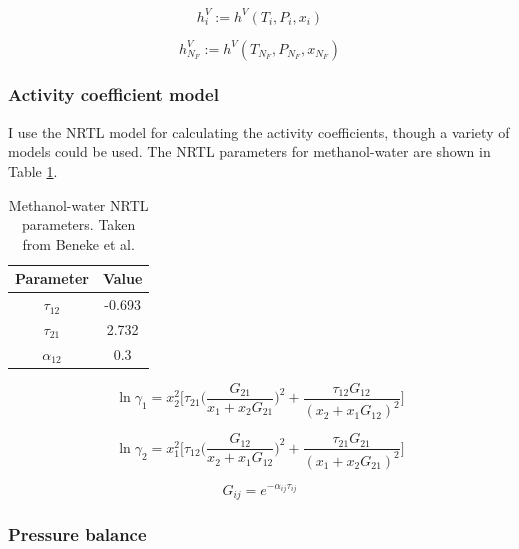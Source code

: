 \begin{equation}
    h^V_i := h^V(T_i, P_i,x_i)
\end{equation}

\begin{equation}
    h^V_{N_F} := h^V(T_{N_F}, P_{N_F},x_{N_F})
\end{equation}


\subsubsection{Activity coefficient model}

I use the NRTL model for calculating the activity coefficients, though a variety of models could be used. The NRTL parameters for methanol-water are shown in Table \ref{tab:nrtl_parameters}.

\begin{table}[]
    \centering
    \caption{Methanol-water NRTL parameters. Taken from Beneke et al.\cite{Beneke2012}}
    \begin{tabular}{cc}
        Parameter & Value \\
        \hline
         $\tau_{12}$ & -0.693  \\
         $\tau_{21}$ & 2.732   \\
         $\alpha_{12}$ & 0.3 \\
    \end{tabular}
    \label{tab:nrtl_parameters}
\end{table}

\begin{equation}
    \ln \gamma_{1} = x_2^2\biggl [\tau_{21} \biggl (\frac{G_{21}}{x_1+x_2G_{21}}\biggr)^2 + \frac{\tau_{12}G_{12}}{(x_2 + x_1 G_{12})^2} \biggr ]
\end{equation}

\begin{equation}
     \ln \gamma_{2} = x_1^2\biggl [\tau_{12} \biggl (\frac{G_{12}}{x_2+x_1G_{12}}\biggr)^2 + \frac{\tau_{21}G_{21}}{(x_1 + x_2 G_{21})^2} \biggr ]   
\end{equation}

\begin{equation}
    G_{ij} = e^{-\alpha_{ij} \tau_{ij}}
\end{equation}

\subsubsection{Pressure balance}

